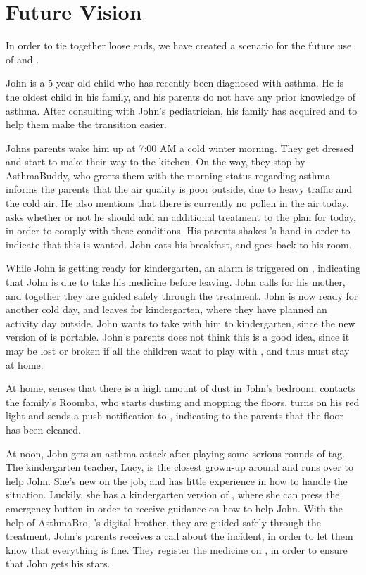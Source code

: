 \section{Future Vision}
\label{sec:futurevision}

In order to tie together loose ends, we have created a scenario for the future use of \app{} and \buddy{}.

John is a 5 year old child who has recently been diagnosed with asthma. He is the oldest child in his family, and his parents do not have any prior knowledge of asthma. After consulting with John's pediatrician, his family has acquired \buddy{} and \app{} to help them make the transition easier. 

Johns parents wake him up at 7:00 AM a cold winter morning. They get dressed and start to make their way to the kitchen. On the way, they stop by AsthmaBuddy, who greets them with the morning status regarding asthma. \buddy{} informs the parents that the air quality is poor outside, due to heavy traffic and the cold air. He also mentions that there is currently no pollen in the air today. \buddy{} asks whether or not he should add an additional treatment to the plan for today, in order to comply with these conditions. His parents shakes \buddy{}'s hand in order to indicate that this is wanted. John eats his breakfast, and goes back to his room. 

While John is getting ready for kindergarten, an alarm is triggered on \buddy{}, indicating that John is due to take his medicine before leaving. John calls for his mother, and together they are guided safely through the treatment. John is now ready for another cold day, and leaves for kindergarten, where they have planned an activity day outside. John wants to take \ab{} with him to kindergarten, since the new version of \ab{} is portable. John's parents does not think this is a good idea, since it may be lost or broken if all the children want to play with \ab{}, and thus \ab{} must stay at home.

At home, \buddy{} senses that there is a high amount of dust in John's bedroom. \buddy{} contacts the family's Roomba, who starts dusting and mopping the floors. \buddy{} turns on his red light and sends a push notification to \app{}, indicating to the parents that the floor has been cleaned. 

At noon, John gets an asthma attack after playing some serious rounds of tag. The kindergarten teacher, Lucy, is the closest grown-up around and runs over to help John. She's new on the job, and has little experience in how to handle the situation. Luckily, she has a kindergarten version of \app{}, where she can press the emergency button in order to receive guidance on how to help John. With the help of AsthmaBro, \buddy{}'s digital brother, they are guided safely through the treatment. John's parents receives a call about the incident, in order to let them know that everything is fine. They register the medicine on \app{}, in order to ensure that John gets his stars.

